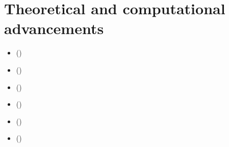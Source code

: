\documentclass[a4paper,12pt,english]{sphinxhowto}
\begin{document}
\section{Theoretical and computational advancements}
\label{\detokenize{pearls:theoretical-and-computational-advancements}}\label{\detokenize{pearls:theoretical-enhancements-label}}
\begin{sphinxcontents}
\begin{itemize}
\item {} 
\sphinxAtStartPar
{}\label{\detokenize{pearls:id168}}{\hyperref[\detokenize{pearls:coping-with-missing-data-and-indeterminateness}]{}} ()

\item {} 
\sphinxAtStartPar
{}\label{\detokenize{pearls:id169}}{\hyperref[\detokenize{pearls:ordinal-correlation-equals-bipolar-valued-relational-equivalence}]{}} ()

\item {} 
\sphinxAtStartPar
{}\label{\detokenize{pearls:id170}}{\hyperref[\detokenize{pearls:applications-of-bipolar-valued-base-3-encoded-bachet-numbers}]{}} ()

\item {} 
\sphinxAtStartPar
{}\label{\detokenize{pearls:id171}}{\hyperref[\detokenize{pearls:on-computing-digraph-kernels}]{}} ()

\item {} 
\sphinxAtStartPar
{}\label{\detokenize{pearls:id172}}{\hyperref[\detokenize{pearls:computational-bipolar-valued-epistemic-logic}]{}} ()

\item {} 
\sphinxAtStartPar
{}\label{\detokenize{pearls:id173}}{\hyperref[\detokenize{pearls:a-new-choice-recommender-algorithm}]{}} ()


\end{itemize}
\end{sphinxcontents}
\end{document}
